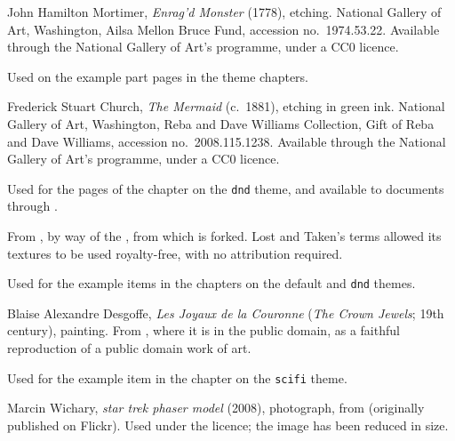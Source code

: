 \begin{description}
		      John Hamilton Mortimer, \textit{Enrag'd Monster} (1778), etching. National Gallery of Art, Washington, Ailsa Mellon Bruce Fund, accession no.~1974.53.22. Available through the National Gallery of Art's  programme, under a CC0 licence.

		\item[The Mermaid] Used on the example part pages in the theme chapters.

		      Frederick Stuart Church, \textit{The Mermaid} (c.~1881), etching in green ink. National Gallery of Art, Washington, Reba and Dave Williams Collection, Gift of Reba and Dave Williams, accession no.~2008.115.1238. Available through the National Gallery of Art's  programme, under a CC0 licence.

		\item[Paper Texture] Used for the pages of the chapter on the \texttt{dnd} theme, and available to documents through .

		      From , by way of the , from which \rpgtex{} is forked. Lost and Taken's terms allowed its textures to be used royalty-free, with no attribution required.

		\item[The Crown Jewels] Used for the example items in the chapters on the default and \texttt{dnd} themes.

		      Blaise Alexandre Desgoffe, \textit{Les Joyaux de la Couronne} (\textit{The Crown Jewels}; 19th century), painting. From , where it is in the public domain, as a faithful reproduction of a public domain work of art.

		\item[Phaser Model] Used for the example item in the chapter on the \texttt{scifi} theme.

		      Marcin Wichary, \textit{star trek phaser model} (2008), photograph, from  (originally published on Flickr). Used under the  licence; the image has been reduced in size.
	\end{description}
